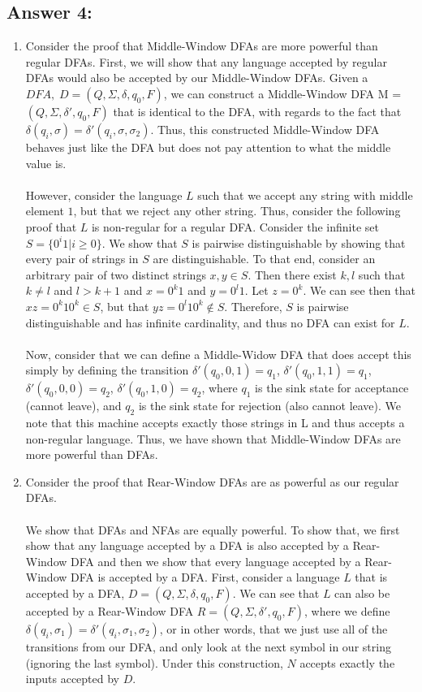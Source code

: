 \documentclass[12pt]{article}
\begin{document}
\subsection*{Answer 4:}
\begin{enumerate}
	\item Consider the proof that Middle-Window DFAs are more powerful than regular DFAs. First, we will show that any language accepted by regular DFAs would also be accepted by our Middle-Window DFAs. Given a $DFA, \; D = (Q, \Sigma, \delta, q_0, F)$, we can construct a Middle-Window DFA M = $(Q, \Sigma, \delta ', q_0, F)$ that is identical to the DFA, with regards to the fact that $\delta(q_i, \sigma) = \delta '(q_i, \sigma, \sigma_2)$. Thus, this constructed
	Middle-Window DFA behaves just like the DFA but does not pay attention to what the middle value is. \\\\However, consider the language $L$ such that we accept any string with middle element $1$, but that we reject any other string. Thus, consider the following proof that $L$ is non-regular for a regular DFA. Consider the infinite set $S = \{0^i1 | i \geq 0\}$. We show that $S$ is pairwise distinguishable by showing that every pair of strings in $S$ are distinguishable. To that end, consider an arbitrary pair of two distinct strings $x, y \in S$. Then there exist $k,l$ such that $k \neq l$ and $l > k+1$ and $x = 0^k1$ and $y = 0^l1$. Let $z = 0^k$. We can see then that $xz = 0^k10^k \in S$, but that $yz = 0^l10^k \not \in S$. Therefore, $S$ is pairwise distinguishable and has infinite cardinality, and thus no DFA
	can exist for $L$. \\\\
	Now, consider that we can define a Middle-Widow DFA that does accept this simply by defining the transition $\delta '(q_0, 0, 1) = q_1$, $\delta '(q_0, 1, 1) = q_1$, $\delta '(q_0, 0, 0) = q_2$, $\delta '(q_0, 1, 0) = q_2$, where $q_1$ is the sink state for acceptance (cannot leave), and $q_2$ is the sink state for rejection (also cannot leave). We note that this machine accepts exactly those strings in L and
	thus accepts a non-regular language. Thus, we have shown that Middle-Window DFAs are more powerful than DFAs.
	\item Consider the proof that Rear-Window DFAs are as powerful as our regular DFAs.\\\\
	We show that DFAs and NFAs are equally powerful. To show that, we first show that any language accepted by a DFA is also accepted by a Rear-Window DFA and then we show that every language accepted by a Rear-Window DFA is accepted by a DFA. First, consider a language $L$ that is accepted by a DFA, $D = (Q, \Sigma, \delta, q_0, F)$. We can see that $L$ can also be accepted by a Rear-Window DFA $R = (Q, \Sigma, \delta ', q_0, F)$, where we define $\delta(q_i, \sigma_1) = \delta '(q_i, \sigma_1, \sigma_2)$, or in other words, that we just use all of the transitions from our DFA, and only look at the next symbol in our string (ignoring the last symbol). Under this construction, $N$ accepts exactly the inputs accepted by $D$.\\\\

\end{enumerate}
\end{document}
